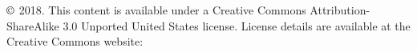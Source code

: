 \chapter*{}
\vfill


\noindent $\copyright$ 2018. This content is available under a Creative Commons Attribution-ShareAlike 3.0 Unported United States license. License details are available at the Creative Commons website:  \\

